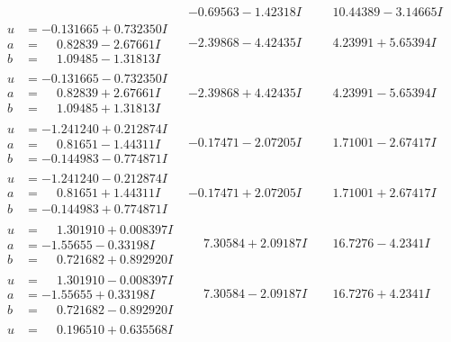 \documentclass[1p]{elsarticle_modified}
\theoremstyle{definition}
\begin{document}
$$\begin{array}{c|c|c}
 & -0.69563 - 1.42318 I & \phantom{-}10.44389 - 3.14665 I \\ \hline\begin{aligned}
u &= -0.131665 + 0.732350 I \\
a &= \phantom{-}0.82839 - 2.67661 I \\
b &= \phantom{-}1.09485 - 1.31813 I\end{aligned}
 & -2.39868 - 4.42435 I & \phantom{-}4.23991 + 5.65394 I \\ \hline\begin{aligned}
u &= -0.131665 - 0.732350 I \\
a &= \phantom{-}0.82839 + 2.67661 I \\
b &= \phantom{-}1.09485 + 1.31813 I\end{aligned}
 & -2.39868 + 4.42435 I & \phantom{-}4.23991 - 5.65394 I \\ \hline\begin{aligned}
u &= -1.241240 + 0.212874 I \\
a &= \phantom{-}0.81651 - 1.44311 I \\
b &= -0.144983 - 0.774871 I\end{aligned}
 & -0.17471 - 2.07205 I & \phantom{-}1.71001 - 2.67417 I \\ \hline\begin{aligned}
u &= -1.241240 - 0.212874 I \\
a &= \phantom{-}0.81651 + 1.44311 I \\
b &= -0.144983 + 0.774871 I\end{aligned}
 & -0.17471 + 2.07205 I & \phantom{-}1.71001 + 2.67417 I \\ \hline\begin{aligned}
u &= \phantom{-}1.301910 + 0.008397 I \\
a &= -1.55655 - 0.33198 I \\
b &= \phantom{-}0.721682 + 0.892920 I\end{aligned}
 & \phantom{-}7.30584 + 2.09187 I & \phantom{-}16.7276 - 4.2341 I \\ \hline\begin{aligned}
u &= \phantom{-}1.301910 - 0.008397 I \\
a &= -1.55655 + 0.33198 I \\
b &= \phantom{-}0.721682 - 0.892920 I\end{aligned}
 & \phantom{-}7.30584 - 2.09187 I & \phantom{-}16.7276 + 4.2341 I \\ \hline\begin{aligned}
u &= \phantom{-}0.196510 + 0.635568 I \\

\end{aligned}
\end{array}$$
\end{document}
